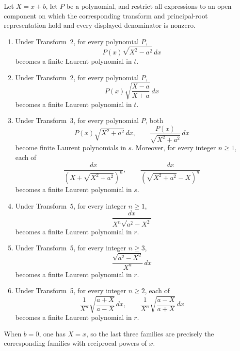\documentclass[10pt,a4paper]{amsart}
\begin{document}
\begin{proposition}
\label{prop:laurent}
Let $X=x+b$, let $P$ be a polynomial, and restrict all expressions to an open component on which the corresponding transform and principal-root representation hold and every displayed denominator is nonzero.
\begin{enumerate}[label=\arabic*.]
\item Under Transform~2, for every polynomial $P$,
\[
P(x)\sqrt{X^2-a^2}\,dx
\]
becomes a finite Laurent polynomial in $t$.
\item Under Transform~2, for every polynomial $P$,
\[
P(x)\sqrt{\frac{X-a}{X+a}}\,dx
\]
becomes a finite Laurent polynomial in $t$.
\item Under Transform~3, for every polynomial $P$, both
\[
P(x)\sqrt{X^2+a^2}\,dx,
\qquad
\frac{P(x)}{\sqrt{X^2+a^2}}\,dx
\]
become finite Laurent polynomials in $s$. Moreover, for every integer $n\ge1$, each of
\[
\frac{dx}{\left(X+\sqrt{X^2+a^2}\right)^n},
\qquad
\frac{dx}{\left(\sqrt{X^2+a^2}-X\right)^n}
\]
becomes a finite Laurent polynomial in $s$.
\item Under Transform~5, for every integer $n\ge1$,
\[
\frac{dx}{X^n\sqrt{a^2-X^2}}
\]
becomes a finite Laurent polynomial in $r$.
\item Under Transform~5, for every integer $n\ge3$,
\[
\frac{\sqrt{a^2-X^2}}{X^n}\,dx
\]
becomes a finite Laurent polynomial in $r$.
\item Under Transform~5, for every integer $n\ge2$, each of
\[
\frac{1}{X^n}\sqrt{\frac{a+X}{a-X}}\,dx,
\qquad
\frac{1}{X^n}\sqrt{\frac{a-X}{a+X}}\,dx
\]
becomes a finite Laurent polynomial in $r$.
\end{enumerate}
When $b=0$, one has $X=x$, so the last three families are precisely the corresponding families with reciprocal powers of $x$.
\end{proposition}
\end{document}
